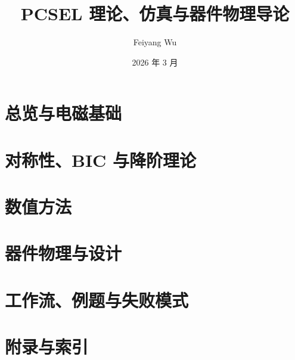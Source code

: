 \documentclass[UTF8,11pt,openany,oneside]{ctexbook}
\title{PCSEL 理论、仿真与器件物理导论}
\author{Feiyang Wu}
\date{2026 年 3 月}
\begin{document}
\hypersetup{pageanchor=false}

\hypersetup{pageanchor=true}
\frontmatter

\tableofcontents
\cleardoublepage

\cleardoublepage


\mainmatter
\part{总览与电磁基础}





\part{对称性、BIC 与降阶理论}







\part{数值方法}




\part{器件物理与设计}








\part{工作流、例题与失败模式}



\part{附录与索引}






\backmatter


\end{document}
